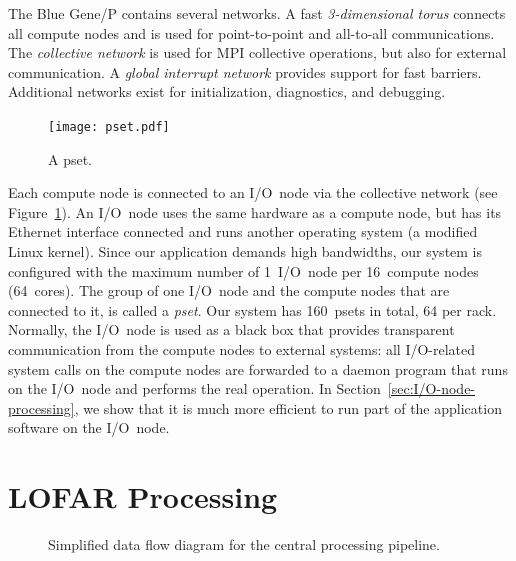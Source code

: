 \documentclass[10pt]{article}
\begin{document}
The Blue Gene/P contains several networks.
A fast \emph{3-dimensional torus\/} connects all compute nodes and is used
for point-to-point and all-to-all communications.
The \emph{collective network\/} is used for MPI collective operations,
but also for external communication.
A \emph{global interrupt network\/} provides support for fast barriers.
Additional networks exist for initialization, diagnostics, and debugging.

\begin{figure}[ht]
\begin{center}
\texttt{[image: pset.pdf]}
\end{center}
\caption{A pset.}
\label{fig:pset}
\end{figure}

Each compute node is connected to an I/O~node via the collective network
(see Figure~\ref{fig:pset}).
An I/O~node uses the same hardware as a compute node, but has its Ethernet
interface connected and runs another operating system (a modified Linux kernel).
Since our application demands high bandwidths, our system is configured with
the maximum number of 1~I/O~node per 16~compute nodes (64~cores).
The group of one I/O~node and the compute nodes that are connected to it,
is called a \emph{pset}.
Our system has 160~psets in total, 64 per rack.
Normally, the I/O~node is used as a black box that provides transparent
communication from the compute nodes to external systems: all I/O-related
system calls on the compute nodes are forwarded to a daemon program that runs
on the I/O~node and performs the real operation.
In Section~\ref{sec:I/O-node-processing}, we show that it is much more
efficient to run part of the application software on the I/O~node.


\section{LOFAR Processing}

\begin{figure}[ht]
\caption{Simplified data flow diagram for the central processing pipeline.}
\label{fig:processing}
\end{figure}
\end{document}
